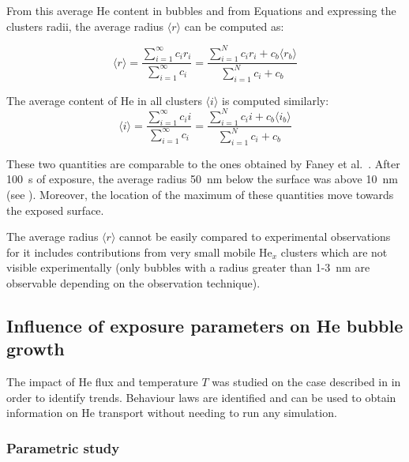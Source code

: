 From this average \gls{He} content in bubbles and from Equations  and  expressing the clusters radii, the average radius $\langle r \rangle$ can be computed as:

\begin{equation}
        \langle r \rangle = \frac{\sum\limits_{i=1}^\infty c_i r_i}{\sum\limits_{i=1}^\infty c_i}
        = \frac{\sum\limits_{i=1}^N c_i r_i + c_b \langle r_b \rangle }{\sum\limits_{i=1}^N c_i + c_b}
\end{equation}

The average content of \gls{He} in all clusters $\langle i \rangle$ is computed similarly:
\begin{equation}
        \langle i \rangle = \frac{\sum\limits_{i=1}^\infty c_i i}{\sum\limits_{i=1}^\infty c_i}
        = \frac{\sum\limits_{i=1}^N c_i i + c_b \langle i_b \rangle }{\sum\limits_{i=1}^N c_i + c_b}
\end{equation}

These two quantities are comparable to the ones obtained by Faney et al.\ .
After \SI{100}{s} of exposure, the average radius \SI{50}{nm} below the surface was above \SI{10}{nm} (see ).
Moreover, the location of the maximum of these quantities move towards the exposed surface.

The average radius $\langle r \rangle$ cannot be easily compared to experimental observations for it includes contributions from very small mobile He$_x$ clusters which are not visible experimentally (only bubbles with a radius greater than 1-\SI{3}{nm} are observable depending on the observation technique).

\subsection{Influence of exposure parameters on He bubble growth}
The impact of He flux and temperature $T$ was studied on the case described in  in order to identify trends.
Behaviour laws are identified and can be used to obtain information on He transport without needing to run any simulation.

\subsubsection{Parametric study} 

